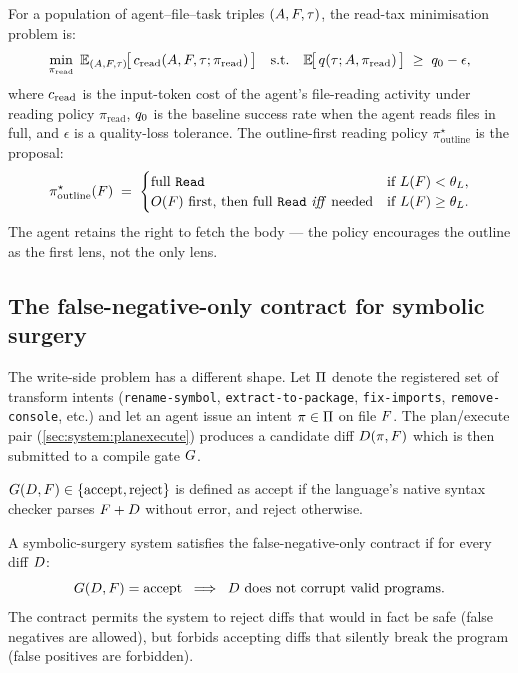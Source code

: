 For a population of agent--file--task triples $(A, F,
\tau)$, the read-tax minimisation problem is:
\[
  \min_{\pi_\text{read}}\;
    \mathbb{E}_{(A, F, \tau)}\!
      \big[\, c_\text{read}(A, F, \tau; \pi_\text{read}) \,\big]
  \quad
  \text{s.t.}
  \quad
  \mathbb{E}\!\big[\, q(\tau; A, \pi_\text{read}) \,\big]
    \;\geq\; q_0 - \epsilon,
\]
where $c_\text{read}$ is the input-token cost of the agent's
file-reading activity under reading policy $\pi_\text{read}$,
$q_0$ is the baseline success rate when the agent reads
files in full, and $\epsilon$ is a quality-loss tolerance. The
outline-first reading policy $\pi^\star_\text{outline}$ is the
proposal:
\[
  \pi^\star_\text{outline}(F) \;=\;
    \begin{cases}
      \text{full \texttt{Read}} & \text{if } L(F) < \theta_{L}, \\
      O(F) \text{ first, then full \texttt{Read} \emph{iff} needed}
        & \text{if } L(F) \geq \theta_{L}.
    \end{cases}
\]
The agent retains the right to fetch the body --- the policy
encourages the outline as the first lens, not the only lens.

\subsection{The false-negative-only contract for symbolic surgery}
\label{sec:problem:falsenegative}

The write-side problem has a different shape. Let
$\Pi$ denote the registered set of transform intents
(\texttt{rename-symbol}, \texttt{extract-to-package},
\texttt{fix-imports}, \texttt{remove-console}, etc.) and let an agent
issue an intent $\pi \in \Pi$ on file $F$. The
plan/execute pair (\cref{sec:system:planexecute}) produces a candidate
diff $D(\pi, F)$ which is then submitted to a compile gate
$G$.

\begin{definition}
\label{def:gate}
$G(D, F) \in \{\text{accept}, \text{reject}\}$ is
defined as $\text{accept}$ if the language's native syntax checker
parses $F + D$ without error, and $\text{reject}$ otherwise.
\end{definition}

\begin{definition}
\label{def:false_negative}
A symbolic-surgery system satisfies the false-negative-only contract
if for every diff $D$:
\[
  G(D, F) = \text{accept} \;\implies\;
    D \text{ does not corrupt valid programs.}
\]
The contract permits the system to reject diffs that would in fact be
safe (false negatives are allowed), but forbids accepting diffs that
silently break the program (false positives are forbidden).
\end{definition}

